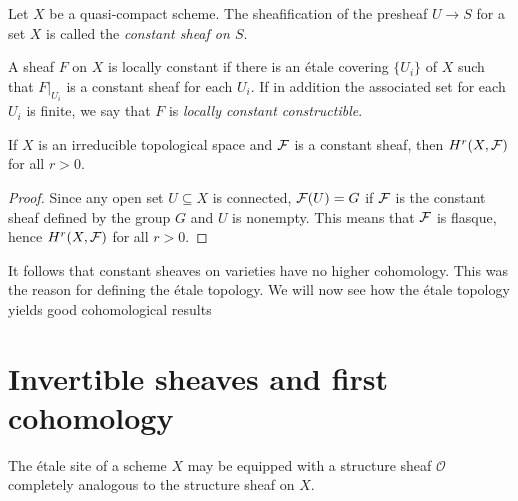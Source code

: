 %
%
\begin{definition}
	Let $X$ be a quasi-compact scheme. The sheafification of the presheaf $U \to S$ for a set $X$ is called the \textit{constant sheaf on $S$}.
\end{definition}

\begin{definition}
	A sheaf $F$ on $X$ is locally constant if there is an \'etale covering $\{U_i\}$ of $X$ such that $F|_{U_i}$ is a constant sheaf for each $U_i$. If in addition the associated set for each $U_i$ is finite, we say that $F$ is \textit{locally constant constructible}.
\end{definition}

\begin{theorem}
	If $X$ is an irreducible topological space and $\mathcal{F}$ is a constant sheaf, then $H^r(X, \mathcal{F})$ for all $r>0$.
\end{theorem}
\begin{proof}
	Since any open set $U \subseteq X$ is connected, $\mathcal{F}(U) = G$ if $\mathcal{F}$ is the constant sheaf defined by the group $G$ and $U$ is nonempty. This means that $\mathcal{F}$ is flasque, hence $H^r(X, \mathcal{F})$ for all $r>0$.
\end{proof}
It follows that constant sheaves on varieties have no higher cohomology. This was the reason for defining the \'etale topology. We will now see how the \'etale topology yields good cohomological results

\section{Invertible sheaves and first cohomology}
The \'etale site of a scheme $X$ may be equipped with a structure sheaf $\mathcal{O}$ completely analogous to the structure sheaf on $X$.

